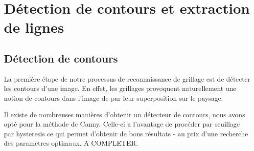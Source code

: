 \section{Détection de contours et extraction de lignes}

\subsection{Détection de contours}

La première étape de notre processus de reconnaissance de grillage est de détecter les contours d'une image. En effet, les grillages provoquent naturellement une notion de contours dans l'image de par leur superposition sur le paysage.

Il existe de nombreuses manières d'obtenir un détecteur de contours, nous avons opté pour la méthode de Canny. Celle-ci a l'avantage de procéder par seuillage par hysteresis ce qui permet d'obtenir de bons résultats - au prix d'une recherche des paramètres optimaux. A COMPLETER.

